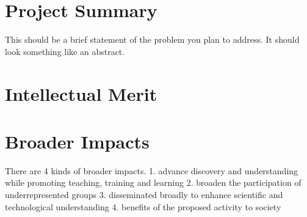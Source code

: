 
\section{Project Summary}
This should be a brief statement of the problem you plan to address.
It should look something like an abstract. 

\section{Intellectual Merit}

\section{Broader Impacts}
There are 4 kinds of broader impacts.
1. advance discovery and understanding while promoting teaching,
training and learning
2. broaden the participation of underrepresented groups
3. disseminated broadly to enhance scientific and technological
understanding
4. benefits of the proposed activity to society
